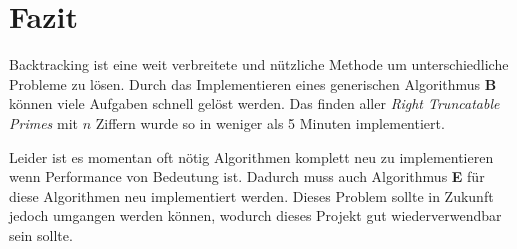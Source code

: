 \chapter*{Fazit}
Backtracking ist eine weit verbreitete und nützliche Methode
um unterschiedliche Probleme zu lösen. Durch das Implementieren eines generischen Algorithmus \textbf{B}
können viele Aufgaben schnell gelöst werden. Das finden aller \textit{Right Truncatable Primes} mit $n$ Ziffern\cite[src/primes.rs]{Kauschke}
wurde so in weniger als 5 Minuten implementiert. 

Leider ist es momentan oft nötig Algorithmen komplett neu zu implementieren wenn Performance von Bedeutung ist.
Dadurch muss auch Algorithmus \textbf{E} für diese Algorithmen neu implementiert werden. Dieses Problem sollte in
Zukunft jedoch umgangen werden können, wodurch dieses Projekt gut wiederverwendbar sein sollte.